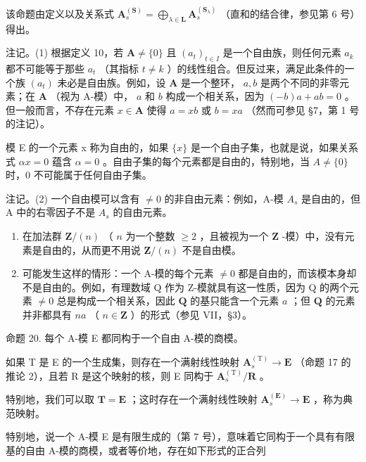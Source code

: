 该命题由定义以及关系式 \(\mathbf{A}_{s}^{(\mathbf{S})} = \bigoplus_{\lambda \in \mathbf{L}} \mathbf{A}_{s}^{(\mathbf{S}_{\lambda})}\) （直和的结合律，参见第 6 号）得出。

注记。(1) 根据定义 10，若 \(\mathbf{A} \neq \{0\}\) 且 \((a_{t})_{t \in I}\) 是一个自由族，则任何元素 \(a_{k}\) 都不可能等于那些 \(a_{t}\) （其指标 \(t \neq k\) ）的线性组合。但反过来，满足此条件的一个族 \((a_{t})\) 未必是自由族。例如，设 \(\mathbf{A}\) 是一个整环， \(a, b\) 是两个不同的非零元素；在 \(\mathbf{A}\) （视为 A-模）中， \(a\) 和 \(b\) 构成一个相关系，因为 \((-b)a + ab = 0\) 。但一般而言，不存在元素 \(x \in \mathbf{A}\) 使得 \(a = xb\) 或 \(b = xa\) （然而可参见 §7，第 1 号的注记）。

模 E 的一个元素 x 称为自由的，如果 \(\{x\}\) 是一个自由子集，也就是说，如果关系式 \(\alpha x = 0\) 蕴含 \(\alpha = 0\) 。自由子集的每个元素都是自由的，特别地，当 \(A \neq \{0\}\) 时，0 不可能属于任何自由子集。

注记。(2) 一个自由模可以含有 \(\neq0\) 的非自由元素：例如，A-模 \(A_{s}\) 是自由的，但 A 中的右零因子不是 \(A_{s}\) 的自由元素。

\begin{enumerate}
\def\labelenumi{(\arabic{enumi})}
\setcounter{enumi}{2}
\item
  在加法群 \(\mathbf{Z} / (n)\) （ \(n\) 为一个整数 \(\geqslant 2\) ，且被视为一个 \(\mathbf{Z}\) -模）中，没有元素是自由的，从而更不用说 \(\mathbf{Z} / (n)\) 不是自由模。
\item
  可能发生这样的情形：一个 A-模的每个元素 \(\neq0\) 都是自由的，而该模本身却不是自由的。例如，有理数域 Q 作为 Z-模就具有这一性质，因为 Q 的两个元素 \(\neq0\) 总是构成一个相关系，因此 \(\mathbf{Q}\) 的基只能含一个元素 \(a\) ；但 \(\mathbf{Q}\) 的元素并非都具有 \(na\) （ \(n \in \mathbf{Z}\) ）的形式（参见 VII，§3）。
\end{enumerate}

命题 20. 每个 A-模 E 都同构于一个自由 A-模的商模。

如果 T 是 E 的一个生成集，则存在一个满射线性映射 \(\mathbf{A}_{s}^{(\mathrm{T})}\to\mathbf{E}\) （命题 17 的推论 2），且若 R 是这个映射的核，则 E 同构于 \(\mathbf{A}_{s}^{(\mathrm{T})}/\mathbf{R}\) 。

特别地，我们可以取 \(\mathbf{T} = \mathbf{E}\) ；这时存在一个满射线性映射 \(\mathbf{A}_s^{(\mathbf{E})} \to \mathbf{E}\) ，称为典范映射。

特别地，说一个 A-模 E 是有限生成的（第 7 号），意味着它同构于一个具有有限基的自由 A-模的商模，或者等价地，存在如下形式的正合列

